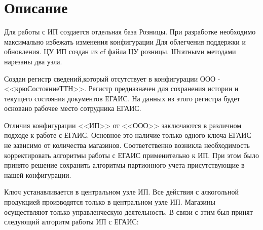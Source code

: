 \section{Описание}

Для работы с ИП создается отдельная база Розницы. При разработке необходимо максимально избежать изменения конфигурации Для облегчения поддержки и обновления. ЦУ ИП создан из cf файла ЦУ розницы. Штатными методами нарезаны два узла.

Создан регистр сведений,который отсутствует в конфигурации ООО - <<крюСостояниеТТН>>. Регистр предназначен для сохранения истории и текущего состояния документов ЕГАИС. На данных из этого регистра будет основано рабочее место сотрудника ЕГАИС.  \par

Отличия конфигурации <<ИП>> от <<ООО>> заключаются в различном подходе к работе с ЕГАИС.
 \framebox[0.65\textwidth][c]{\textcolor{blue}{И мы до сих пор не знаем есть ли отличия в торговле табаком!}} Основное это наличие только одного ключа ЕГАИС не зависимо от количества магазинов. Соответственно возникла необходимость корректировать алгоритмы работы с ЕГАИС применительно к ИП. При этом было принято решение сохранить алгоритмы партионного учета присутствующие в нашей конфигурации.\par
 Ключ устанавливается в центральном узле ИП. Все действия с алкогольной продукцией производятся только в центральном узле ИП. Магазины осуществляют только управленческую деятельность. В связи с этим  был принят следующий алгоритм работы ИП с ЕГАИС:
